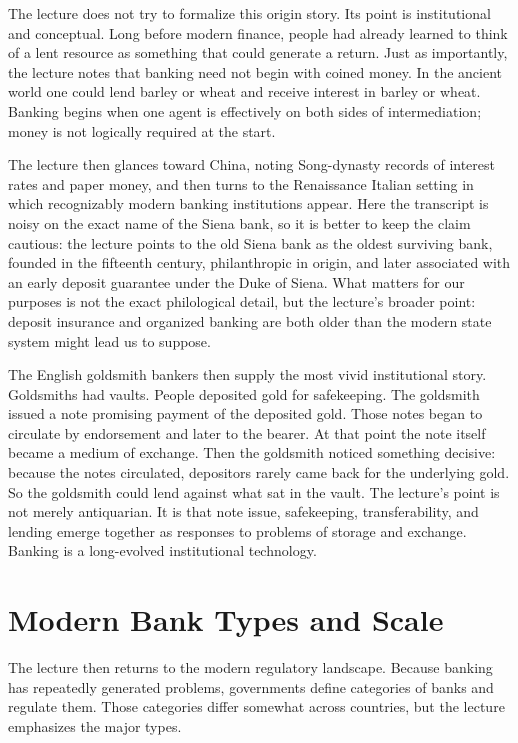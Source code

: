 The lecture does not try to formalize this origin story. Its point is institutional and conceptual. Long before modern finance, people had already learned to think of a lent resource as something that could generate a return. Just as importantly, the lecture notes that banking need not begin with coined money. In the ancient world one could lend barley or wheat and receive interest in barley or wheat. Banking begins when one agent is effectively on both sides of intermediation; money is not logically required at the start.

The lecture then glances toward China, noting Song-dynasty records of interest rates and paper money, and then turns to the Renaissance Italian setting in which recognizably modern banking institutions appear. Here the transcript is noisy on the exact name of the Siena bank, so it is better to keep the claim cautious: the lecture points to the old Siena bank as the oldest surviving bank, founded in the fifteenth century, philanthropic in origin, and later associated with an early deposit guarantee under the Duke of Siena. What matters for our purposes is not the exact philological detail, but the lecture's broader point: deposit insurance and organized banking are both older than the modern state system might lead us to suppose.

The English goldsmith bankers then supply the most vivid institutional story. Goldsmiths had vaults. People deposited gold for safekeeping. The goldsmith issued a note promising payment of the deposited gold. Those notes began to circulate by endorsement and later to the bearer. At that point the note itself became a medium of exchange. Then the goldsmith noticed something decisive: because the notes circulated, depositors rarely came back for the underlying gold. So the goldsmith could lend against what sat in the vault. The lecture's point is not merely antiquarian. It is that note issue, safekeeping, transferability, and lending emerge together as responses to problems of storage and exchange. Banking is a long-evolved institutional technology.

\section{Modern Bank Types and Scale}

The lecture then returns to the modern regulatory landscape. Because banking has repeatedly generated problems, governments define categories of banks and regulate them. Those categories differ somewhat across countries, but the lecture emphasizes the major types.

